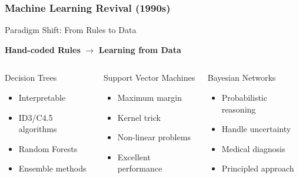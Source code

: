 \documentclass{beamer}
\begin{document}
\begin{frame}
    \frametitle{Machine Learning Revival (1990s)}
    \begin{block}{Paradigm Shift: From Rules to Data}
        \begin{center}
            \textbf{Hand-coded Rules} $\rightarrow$ \textbf{Learning from Data}
        \end{center}
    \end{block}
    
    \begin{columns}
        \begin{column}{0.33\textwidth}
            \begin{alertblock}{Decision Trees}
                \begin{itemize}
                    \item Interpretable
                    \item ID3/C4.5 algorithms
                    \item Random Forests
                    \item Ensemble methods
                \end{itemize}
            \end{alertblock}
        \end{column}
        \begin{column}{0.33\textwidth}
            \begin{exampleblock}{Support Vector Machines}
                \begin{itemize}
                    \item Maximum margin
                    \item Kernel trick
                    \item Non-linear problems
                    \item Excellent performance
                \end{itemize}
            \end{exampleblock}
        \end{column}
        \begin{column}{0.33\textwidth}
            \begin{block}{Bayesian Networks}
                \begin{itemize}
                    \item Probabilistic reasoning
                    \item Handle uncertainty
                    \item Medical diagnosis
                    \item Principled approach
                \end{itemize}
            \end{block}
        \end{column}
    \end{columns}
    

\end{frame}
\end{document}
